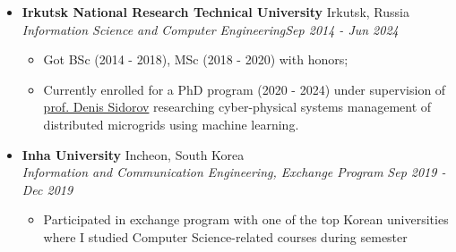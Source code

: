 \documentclass[10pt]{article}
\begin{document}
\begin{itemize}[itemsep=4pt,topsep=0pt]
    \item \normalsize{\textbf{Irkutsk National Research Technical University}} \normalsize{\hfill Irkutsk, Russia 
    \\    \textit{ Information Science and Computer Engineering}\hfill \textit{Sep 2014 - Jun 2024}}
            \begin{itemize}[topsep=4pt] \normalsize

                \item {Got BSc (2014 - 2018), MSc (2018 - 2020) with honors;}
                \item {Currently enrolled for a PhD program (2020 - 2024) under supervision of \href{http://www.mathnet.ru/eng/person17845}{prof. Denis Sidorov} researching cyber-physical systems management of distributed microgrids using machine learning.}
            \end{itemize}
        \item \normalsize{\textbf{Inha University}} \normalsize{\hfill Incheon, South Korea 
    \\    \textit{ Information and Communication Engineering, Exchange Program }\hfill \textit{Sep 2019 - Dec 2019}}
            \begin{itemize}[itemsep=1pt,topsep=4pt] \normalsize
                \item{Participated in exchange program with one of the top Korean universities where I studied Computer Science-related courses during semester}
                    
            \end{itemize}
        \end{itemize}

\end{document}
